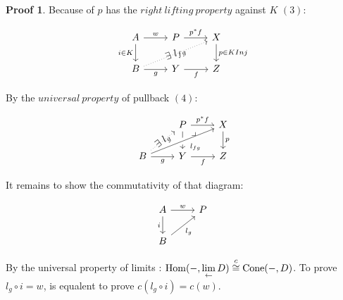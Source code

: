 \documentclass[a4paper]{article}
\theoremstyle{plain}
\theoremstyle{definition}
\newtheorem*{prf}{Proof}
\theoremstyle{remark}
\newcommand{\E}{\exists}
\DeclareMathOperator{\Hom}{\rm{Hom}}
\DeclareMathOperator{\Cone}{Cone}
\begin{document}
\begin{prf}
            \par Because of $p$ has the $right\ lifting\ property$ against $K$ $(3)$:

            \[\begin{tikzcd}
                A & P & X \\
                B & Y & Z
                \arrow["f"', from=2-2, to=2-3]
                \arrow["{p \in K Inj}", from=1-3, to=2-3]
                \arrow["p^*f", from=1-2, to=1-3]
                \arrow["g"', from=2-1, to=2-2]
                \arrow["w", from=1-1, to=1-2]
                \arrow["{{i \in K}}"', from=1-1, to=2-1]
                \arrow["{\E \ l_{fg}}"{marking}, dotted, from=2-1, to=1-3]
            \end{tikzcd}\]

            \par By the $universal\ property$ of pullback $(4)$:

            \[\begin{tikzcd}
                & P & X \\
                B & Y & Z
                \arrow["f"', from=2-2, to=2-3]
                \arrow["p", from=1-3, to=2-3]
                \arrow[from=1-2, to=2-2]
                \arrow["p^*f", from=1-2, to=1-3]
                \arrow["g"', from=2-1, to=2-2]
                \arrow["{\ \ \! l_{fg}}"', from=2-1, to=1-3, crossing over]
                \arrow["{\E \ l_g}"{marking}, dotted, from=2-1, to=1-2]
                \arrow["{\big \lrcorner}"{anchor=center, pos=0.125}, draw=none, from=1-2, to=2-3]
            \end{tikzcd}\]

            \par It remains to show the commutativity of that diagram:

            \[\begin{tikzcd}
                A & P \\
                B
                \arrow["{l_{g}}"', from=2-1, to=1-2]
                \arrow["{i}"', from=1-1, to=2-1]
                \arrow["w", from=1-1, to=1-2]
            \end{tikzcd}\]

            \par By the universal property of limits :
            $\Hom(-, \lim\limits_{\leftarrow} D) \overset{c}{\cong} \Cone(-, D)$.
            To prove $l_g \circ i = w$, is equalent to prove $c(l_g \circ i) = c(w)$.


\end{prf}
\end{document}
